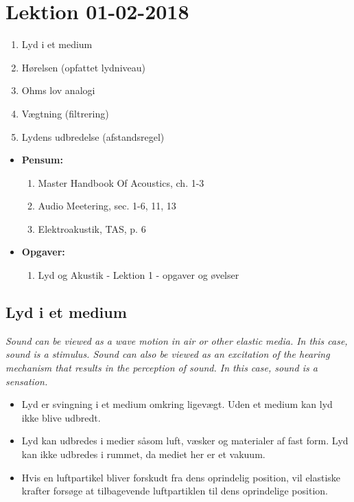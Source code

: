 \section{Lektion 01-02-2018}

\begin{enumerate}
	\item Lyd i et medium
	\item Hørelsen (opfattet lydniveau)
	\item Ohms lov analogi
	\item Vægtning (filtrering)
	\item Lydens udbredelse (afstandsregel)
	\end{enumerate}

\begin{mdframed}[style=exampledefault]
	\begin{itemize}
		\item \textbf{Pensum:} 
		\begin{enumerate}
			\item Master Handbook Of Acoustics, ch. 1-3
			\item Audio Meetering, sec. 1-6, 11, 13
			\item Elektroakustik, TAS,  p. 6
		\end{enumerate}
		\item \textbf{Opgaver:} 
		\begin{enumerate}
			\item Lyd og Akustik - Lektion 1 - opgaver og øvelser
		\end{enumerate}
	\end{itemize}
\end{mdframed}

\subsection{Lyd i et medium}

\textit{Sound can be viewed as a wave motion in air or other elastic media. In this case,	sound is a stimulus. Sound can also be viewed as an excitation of the hearing	mechanism that results in the perception of sound. In this case, sound is a sensation.}
\begin{itemize}
	\item Lyd er svingning i et medium omkring ligevægt. Uden et medium kan lyd ikke blive udbredt. 
	\item Lyd kan udbredes i medier såsom luft, væsker og materialer af fast form. Lyd kan ikke udbredes i rummet, da mediet her er et vakuum. 
	\item Hvis en luftpartikel bliver forskudt fra dens oprindelig position, vil elastiske krafter forsøge at tilbagevende luftpartiklen til dens oprindelige position.
\end{itemize}

